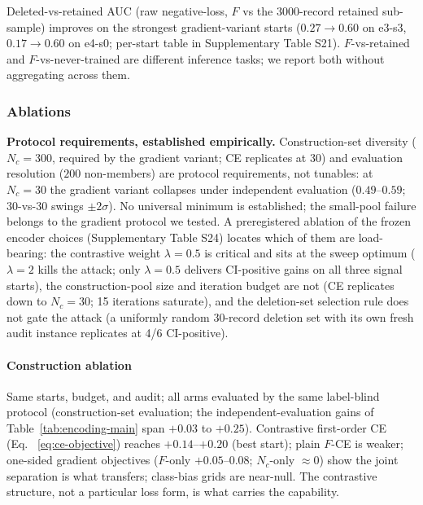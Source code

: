 \documentclass[lettersize,journal]{IEEEtran}
\begin{document}
Deleted-vs-retained AUC (raw negative-loss, $F$ vs the
3000-record retained sub-sample) improves on the strongest
gradient-variant starts ($0.27\to0.60$ on e3-s3,
$0.17\to0.60$ on e4-s0; per-start table in Supplementary
Table S21). $F$-vs-retained and $F$-vs-never-trained are
different inference tasks; we report both without aggregating
across them.


\subsubsection{Ablations}\label{sec:ablations}
\textbf{Protocol requirements, established empirically.}
Construction-set diversity ($N_c{=}300$, required by the
gradient variant; CE replicates at 30) and evaluation
resolution ($200$ non-members) are protocol requirements,
not tunables: at $N_c{=}30$ the gradient variant collapses
under independent evaluation ($0.49$--$0.59$;
$30$-vs-$30$ swings ${\pm}2\sigma$). No universal minimum is
established; the small-pool failure belongs to the gradient
protocol we tested. A preregistered ablation of the frozen
encoder choices (Supplementary Table S24) locates which of
them are load-bearing: the contrastive weight
$\lambda{=}0.5$ is critical and sits at the sweep optimum
($\lambda{=}2$ kills the attack; only $\lambda{=}0.5$
delivers CI-positive gains on all three signal starts), the
construction-pool size and iteration budget are not (CE
replicates down to $N_c{=}30$; 15 iterations saturate), and
the deletion-set selection rule does not gate the attack (a
uniformly random 30-record deletion set with its own fresh
audit instance replicates at 4/6 CI-positive).


\paragraph*{Construction ablation}
Same starts, budget, and audit; all arms evaluated by the same
label-blind protocol (construction-set evaluation; the
independent-evaluation gains of
Table~\ref{tab:encoding-main} span $+0.03$ to $+0.25$).
Contrastive first-order CE (Eq.~%
\ref{eq:ce-objective}) reaches $+0.14$--$+0.20$ (best start);
plain $F$-CE is weaker; one-sided gradient objectives
($F$-only $+0.05$--$0.08$; $N_c$-only ${\approx}0$) show the
joint separation is what transfers; class-bias grids are
near-null. The contrastive structure, not a particular loss
form, is what carries the capability.
\end{document}
